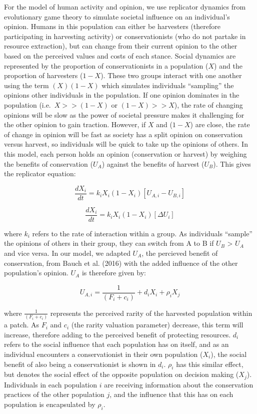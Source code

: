 \documentclass[
  12pt,
]{article}
\begin{document}
For the model of human activity and opinion, we use replicator dynamics from evolutionary game theory to simulate societal influence on an individual's opinion. Humans in this population can either be harvesters (therefore participating in harvesting activity) or conservationists (who do not partake in resource extraction), but can change from their current opinion to the other based on the perceived values and costs of each stance. Social dynamics are represented by the proportion of conservationists in a population (\(X\)) and the proportion of harvesters (\(1-X\)). These two groups interact with one another using the term \((X)(1-X)\) which simulates individuals ``sampling'' the opinions other individuals in the population. If one opinion dominates in the population (i.e.~\(X >> (1-X)\) or \((1-X) >> X\)), the rate of changing opinions will be slow as the power of societal pressure makes it challenging for the other opinion to gain traction. However, if \(X\) and (\(1-X\)) are close, the rate of change in opinion will be fast as society has a split opinion on conservation versus harvest, so individuals will be quick to take up the opinions of others. In this model, each person holds an opinion (conservation or harvest) by weighing the benefits of conservation (\(U_A\)) against the benefits of harvest (\(U_B\)). This gives the replicator equation:

\begin{equation} 
\frac{dX_i}{dt} = k_iX_i(1-X_i)[U_{A,i} - U_{B,i}]
  \label{eq:rep1}
\end{equation}

\begin{equation} 
\frac{dX_i}{dt} = k_iX_i(1-X_i)[\Delta U_i]
  \label{eq:rep2}
\end{equation}

where \(k_i\) refers to the rate of interaction within a group. As individuals ``sample'' the opinions of others in their group, they can switch from A to B if \(U_B\) \textgreater{} \(U_A\) and vice versa. In our model, we adapted \(U_A\), the percieved benefit of conservation, from Bauch et al. (2016) with the added influence of the other population's opinion. \(U_A\) is therefore given by:

\begin{equation} 
U_{A,i} = \frac{1}{(F_i + c_i)} + d_iX_i + \rho_i X_j
  \label{eq:pros1}
\end{equation}

where \(\frac{1}{(F_i + c_i)}\) represents the perceived rarity of the harvested population within a patch. As \(F_i\) and \(c_i\) (the rarity valuation parameter) decrease, this term will increase, therefore adding to the perceived benefit of protecting resources. \(d_i\) refers to the social influence that each population has on itself, and as an individual encounters a conservationist in their own population (\(X_i\)), the social benefit of also being a conservationist is shown in \(d_i\). \(\rho_i\) has this similar effect, but denotes the social effect of the opposite population on decision making (\(X_j\)). Individuals in each population \(i\) are receiving information about the conservation practices of the other population \(j\), and the influence that this has on each population is encapsulated by \(\rho_i\).
\end{document}

